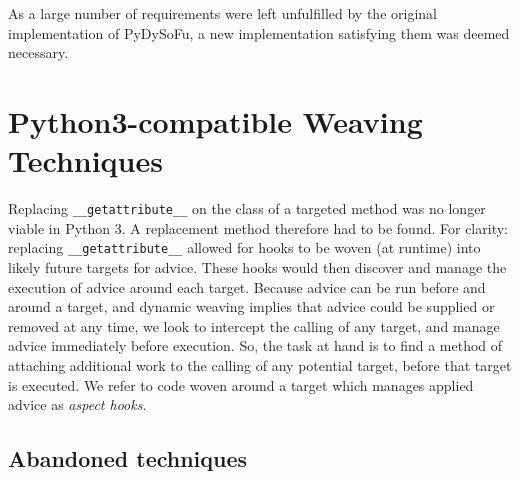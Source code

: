 As a large number of requirements were left unfulfilled by the original
implementation of PyDySoFu, a new implementation satisfying them was deemed
necessary.


\section{Python3-compatible Weaving Techniques}\label{sec:pdsf3python3}

Replacing \lstinline{__getattribute__} on the class of a targeted method was no
longer viable in Python 3. A replacement method therefore had to be found. For
clarity: replacing \lstinline{__getattribute__} allowed for hooks to be woven
(at runtime) into likely future targets for advice. These hooks would then
discover and manage the execution of advice around each target. Because advice
can be run before and around a target, and dynamic weaving implies that advice
could be supplied or removed at any time, we look to intercept the calling of
any target, and manage advice immediately before execution. So, the task at
hand is to find a method of attaching additional work to the calling of any
potential target, before that target is executed. We refer to code woven
around a target which manages applied advice as \emph{aspect hooks}.


\subsection{Abandoned techniques}\label{subsec:pdsf3badweaving}

